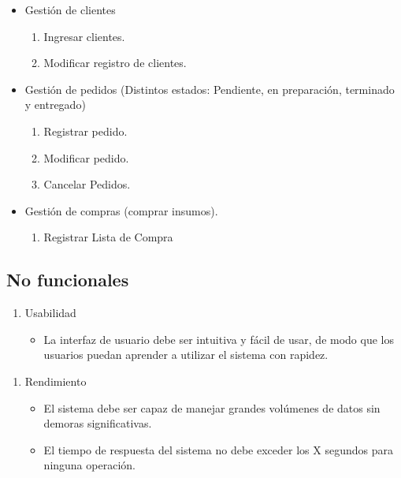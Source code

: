 \documentclass{article}
\begin{document}
\begin{itemize}
	\item Gestión de clientes
	\begin{enumerate}[start=20]
		\item Ingresar clientes.
		\item Modificar registro de clientes.
	\end{enumerate}
\end{itemize}

\begin{itemize}
	\item Gestión de pedidos (Distintos estados: Pendiente, en preparación, terminado y entregado)
	\begin{enumerate}[start=22]
		\item Registrar pedido.
		\item Modificar pedido.
		\item Cancelar Pedidos.
	\end{enumerate}
\end{itemize}

\begin{itemize}
	\item Gestión de compras (comprar insumos).
	\begin{enumerate}[start=25]
		\item Registrar Lista de Compra
	\end{enumerate}
\end{itemize}

\subsection{No funcionales}
\begin{enumerate}
	\item Usabilidad
	\begin{itemize}
		\item La interfaz de usuario debe ser intuitiva y fácil de usar, de modo que los usuarios puedan aprender a utilizar el sistema con rapidez.
	\end{itemize}
\end{enumerate}

\begin{enumerate}[start=2]
	\item Rendimiento
	\begin{itemize}
		\item El sistema debe ser capaz de manejar grandes volúmenes de datos sin demoras significativas.
		\item El tiempo de respuesta del sistema no debe exceder los X segundos para ninguna operación.
	\end{itemize}
\end{enumerate}
\end{document}
